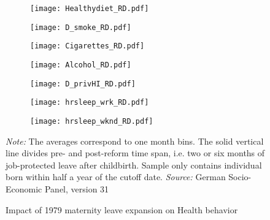 \documentclass[a4paper ]{article}
\begin{document}
\newpage
\begin{figure}[p]
\begin{subfigure}[h]{0.48\textwidth}\centering
	\texttt{[image: Healthydiet\_RD.pdf]}
\end{subfigure}
\quad
\begin{subfigure}[h]{0.48\textwidth}\centering
	\texttt{[image: D\_smoke\_RD.pdf]}
\end{subfigure}

\begin{subfigure}[h]{0.48\textwidth}\centering
	\texttt{[image: Cigarettes\_RD.pdf]}
\end{subfigure}
\quad
\begin{subfigure}[h]{0.48\textwidth}\centering
	\texttt{[image: Alcohol\_RD.pdf]}
\end{subfigure}



\begin{subfigure}[h]{0.48\textwidth}\centering
	\texttt{[image: D\_privHI\_RD.pdf]}
\end{subfigure}
\quad
\begin{subfigure}[h]{0.48\textwidth}\centering
	\texttt{[image: hrsleep\_wrk\_RD.pdf]}
\end{subfigure}

\begin{subfigure}[h]{0.48\textwidth}\centering
	\texttt{[image: hrsleep\_wknd\_RD.pdf]}
\end{subfigure}


\caption{Impact of 1979 maternity leave expansion on Health behavior}\label{fig: RD_HB}
\begin{minipage}{\textwidth} %
{\footnotesize \textit{Note:} The averages correspond to one month bins. The solid vertical line divides pre- and post-reform time span, i.e. two or six months of job-protected leave after childbirth. Sample only contains individual born within half a year of the cutoff date. \newline \textit{Source: }German Socio-Economic Panel, version 31\par}
\end{minipage}
\end{figure}
\end{document}
